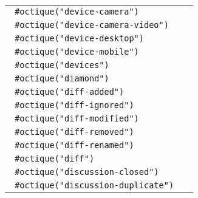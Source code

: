 \begin{longtable}[]{@{}lc@{}}
\texttt{\ \#octique("device-camera")\ } &
\pandocbounded{} \\
\texttt{\ \#octique("device-camera-video")\ } &
\pandocbounded{} \\
\texttt{\ \#octique("device-desktop")\ } &
\pandocbounded{} \\
\texttt{\ \#octique("device-mobile")\ } &
\pandocbounded{} \\
\texttt{\ \#octique("devices")\ } &
\pandocbounded{} \\
\texttt{\ \#octique("diamond")\ } &
\pandocbounded{} \\
\texttt{\ \#octique("diff-added")\ } &
\pandocbounded{} \\
\texttt{\ \#octique("diff-ignored")\ } &
\pandocbounded{} \\
\texttt{\ \#octique("diff-modified")\ } &
\pandocbounded{} \\
\texttt{\ \#octique("diff-removed")\ } &
\pandocbounded{} \\
\texttt{\ \#octique("diff-renamed")\ } &
\pandocbounded{} \\
\texttt{\ \#octique("diff")\ } &
\pandocbounded{} \\
\texttt{\ \#octique("discussion-closed")\ } &
\pandocbounded{} \\
\texttt{\ \#octique("discussion-duplicate")\ } &

\end{longtable}
